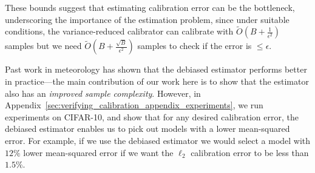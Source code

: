 These bounds suggest that estimating calibration error can be the bottleneck, underscoring the importance of the estimation problem, since under suitable conditions, the variance-reduced calibrator can calibrate with $\widetilde{O}(B + \frac{1}{\epsilon^2})$ samples but we need $\widetilde{O}(B + \frac{\sqrt{B}}{\epsilon^2})$ samples to check if the error is $\leq \epsilon$.

Past work in meteorology has shown that the debiased estimator performs better in practice---the main contribution of our work here is to show that the estimator also has an \emph{improved sample complexity}. However, in Appendix~\ref{sec:verifying_calibration_appendix_experiments}, we run experiments on CIFAR-10, and show that for any desired calibration error, the debiased estimator enables us to pick out models with a lower mean-squared error. For example, if we use the debiased estimator we would select a model with $12\%$ lower mean-squared error if we want the $\ell_2$ calibration error to be less than $1.5\%$.




